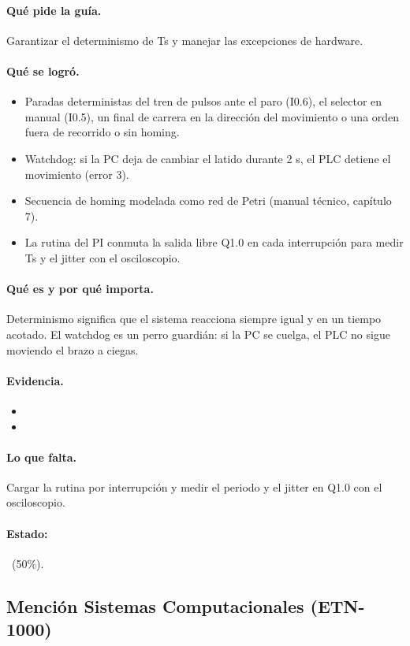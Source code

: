 \documentclass[a4paper,11pt]{article}
\begin{document}
\paragraph{Qué pide la guía.} Garantizar el determinismo de Ts y manejar las excepciones de hardware.
\paragraph{Qué se logró.}
\begin{itemize}
\item Paradas deterministas del tren de pulsos ante el paro (I0.6), el selector en manual (I0.5), un final de carrera en la dirección del movimiento o una orden fuera de recorrido o sin homing.
\item Watchdog: si la PC deja de cambiar el latido  durante 2 s, el PLC detiene el movimiento (error 3).
\item Secuencia de homing modelada como red de Petri (manual técnico, capítulo 7).
\item La rutina del PI conmuta la salida libre Q1.0 en cada interrupción para medir Ts y el jitter con el osciloscopio.
\end{itemize}
\paragraph{Qué es y por qué importa.} Determinismo significa que el sistema reacciona siempre igual y en un tiempo acotado. El watchdog es un perro guardián: si la PC se cuelga, el PLC no sigue moviendo el brazo a ciegas.
\paragraph{Evidencia.}
\begin{itemize}\small
\item {}
\item {}
\end{itemize}
\paragraph{Lo que falta.} Cargar la rutina por interrupción y medir el periodo y el jitter en Q1.0 con el osciloscopio.
\paragraph{Estado:} \parcial~(50\%).
\subsection{Mención Sistemas Computacionales (ETN-1000)}
\end{document}
